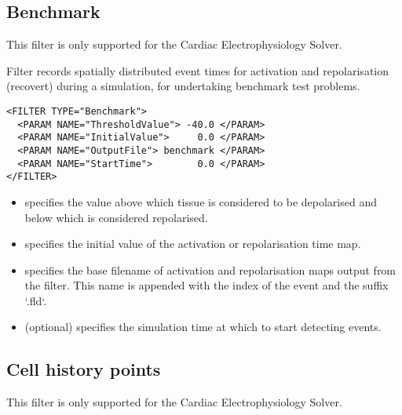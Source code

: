\subsection{Benchmark}\label{filters:Benchmark}

\begin{notebox}
  This filter is only supported for the Cardiac Electrophysiology Solver.
\end{notebox}

Filter  records spatially distributed event times for 
    activation and repolarisation (recovert) during a simulation, for
    undertaking benchmark test problems.
\begin{lstlisting}[style=XmlStyle]
<FILTER TYPE="Benchmark">
  <PARAM NAME="ThresholdValue"> -40.0 </PARAM>
  <PARAM NAME="InitialValue">     0.0 </PARAM>
  <PARAM NAME="OutputFile"> benchmark </PARAM>
  <PARAM NAME="StartTime">        0.0 </PARAM>
</FILTER>
\end{lstlisting}
    \begin{itemize}
        \item {} specifies the value above which tissue is
            considered to be depolarised and below which is considered
            repolarised.
        \item {} specifies the initial value of the
            activation or repolarisation time map.
        \item {} specifies the base filename of activation and
            repolarisation maps output from the filter. This name is appended
            with the index of the event and the suffix `.fld`.
        \item {} (optional) specifies the simulation time at
            which to start detecting events.
    \end{itemize}


\subsection{Cell history points}\label{filters:CellHistoryPoints}

\begin{notebox}
  This filter is only supported for the Cardiac Electrophysiology Solver.
\end{notebox}

